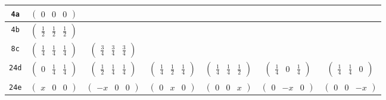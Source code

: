\documentclass[fleqn,9pt,landscape]{jsarticle}
\begin{document}
\begin{center}
\begin{longtable}{ccccccc}
{\tt 4a} & $ \begin{pmatrix} 0 & 0 & 0 \end{pmatrix} $ & $  $ & $  $ & $  $ & $  $ & $  $ \\ \hline
{\tt 4b} & $ \begin{pmatrix} \frac{1}{2} & \frac{1}{2} & \frac{1}{2} \end{pmatrix} $ & $  $ & $  $ & $  $ & $  $ & $  $ \\ \hline
{\tt 8c} & $ \begin{pmatrix} \frac{1}{4} & \frac{1}{4} & \frac{1}{4} \end{pmatrix} $ & $ \begin{pmatrix} \frac{3}{4} & \frac{3}{4} & \frac{3}{4} \end{pmatrix} $ & $  $ & $  $ & $  $ & $  $ \\ \hline
{\tt 24d} & $ \begin{pmatrix} 0 & \frac{1}{4} & \frac{1}{4} \end{pmatrix} $ & $ \begin{pmatrix} \frac{1}{2} & \frac{1}{4} & \frac{1}{4} \end{pmatrix} $ & $ \begin{pmatrix} \frac{1}{4} & \frac{1}{2} & \frac{1}{4} \end{pmatrix} $ & $ \begin{pmatrix} \frac{1}{4} & \frac{1}{4} & \frac{1}{2} \end{pmatrix} $ & $ \begin{pmatrix} \frac{1}{4} & 0 & \frac{1}{4} \end{pmatrix} $ & $ \begin{pmatrix} \frac{1}{4} & \frac{1}{4} & 0 \end{pmatrix} $ \\ \hline
{\tt 24e} & $ \begin{pmatrix} x & 0 & 0 \end{pmatrix} $ & $ \begin{pmatrix} - x & 0 & 0 \end{pmatrix} $ & $ \begin{pmatrix} 0 & x & 0 \end{pmatrix} $ & $ \begin{pmatrix} 0 & 0 & x \end{pmatrix} $ & $ \begin{pmatrix} 0 & - x & 0 \end{pmatrix} $ & $ \begin{pmatrix} 0 & 0 & - x \end{pmatrix} $ \\ \hline

\end{longtable}
\end{center}
\end{document}
